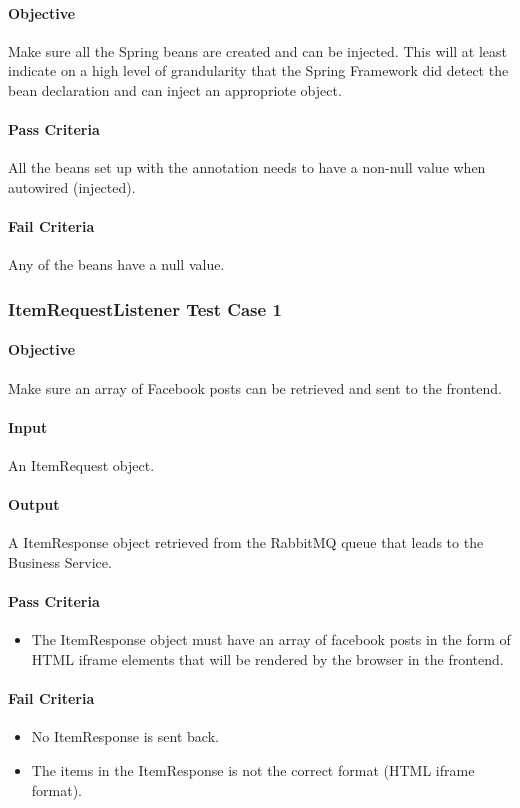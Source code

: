 \documentclass[hidelinks,english]{article}
\begin{document}
				\paragraph{Objective} Make sure all the Spring beans are created and can be injected. This will at least indicate on a high level of grandularity that the Spring Framework did detect the bean declaration and can inject an appropriote object.
				\paragraph{Pass Criteria} All the beans set up with the \emph{\@Bean} annotation needs to have a non-null value when autowired (injected).
				\paragraph{Fail Criteria} Any of the beans have a null value.
				
			\subsubsection{ItemRequestListener Test Case 1}\label{facebookitemlistenertest1}
				\paragraph{Objective} Make sure an array of Facebook posts can be retrieved and sent to the frontend.
				\paragraph{Input} An ItemRequest object.
				\paragraph{Output} A ItemResponse object retrieved from the RabbitMQ queue that leads to the Business Service.
				\paragraph{Pass Criteria}
				\begin{itemize}
					\item The ItemResponse object must have an array of facebook posts in the form of HTML iframe elements that will be rendered by the browser in the frontend.
				\end{itemize}
				\paragraph{Fail Criteria}
				\begin{itemize}
					\item No ItemResponse is sent back.
					\item The items in the ItemResponse is not the correct format (HTML iframe format).
				\end{itemize}
				
\end{document}
